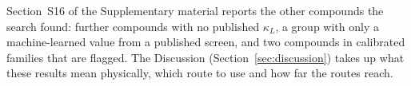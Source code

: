 Section~S16 of the Supplementary material reports the other compounds the search found: further
compounds with no published $\kappa_L$, a group with only a machine-learned value from a published
screen, and two compounds in calibrated families that are flagged. The Discussion
(Section~\ref{sec:discussion}) takes up what these results mean physically, which route to use and how
far the routes reach.
